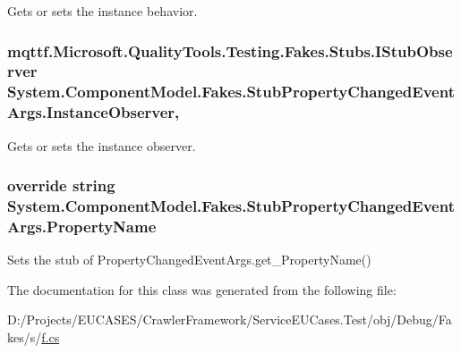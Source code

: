 Gets or sets the instance behavior.

\hypertarget{class_system_1_1_component_model_1_1_fakes_1_1_stub_property_changed_event_args_a347ab7d4afc5234b2b927c8b01477ee5}{
\subsubsection[{Instance\-Observer}]{\setlength{\rightskip}{0pt plus 5cm}mqttf.\-Microsoft.\-Quality\-Tools.\-Testing.\-Fakes.\-Stubs.\-I\-Stub\-Observer System.\-Component\-Model.\-Fakes.\-Stub\-Property\-Changed\-Event\-Args.\-Instance\-Observer\hspace{0.3cm}{\ttfamily [get]}, {\ttfamily [set]}}}\label{class_system_1_1_component_model_1_1_fakes_1_1_stub_property_changed_event_args_a347ab7d4afc5234b2b927c8b01477ee5}


Gets or sets the instance observer.

\hypertarget{class_system_1_1_component_model_1_1_fakes_1_1_stub_property_changed_event_args_aa0d1ae4e4b40a867de20e72bb428e58f}{
\subsubsection[{Property\-Name}]{\setlength{\rightskip}{0pt plus 5cm}override string System.\-Component\-Model.\-Fakes.\-Stub\-Property\-Changed\-Event\-Args.\-Property\-Name\hspace{0.3cm}{\ttfamily [get]}}}\label{class_system_1_1_component_model_1_1_fakes_1_1_stub_property_changed_event_args_aa0d1ae4e4b40a867de20e72bb428e58f}


Sets the stub of Property\-Changed\-Event\-Args.\-get\-\_\-\-Property\-Name()



The documentation for this class was generated from the following file\-:\begin{DoxyCompactItemize}
\item 
D\-:/\-Projects/\-E\-U\-C\-A\-S\-E\-S/\-Crawler\-Framework/\-Service\-E\-U\-Cases.\-Test/obj/\-Debug/\-Fakes/s/\hyperlink{s_2f_8cs}{f.\-cs}\end{DoxyCompactItemize}
